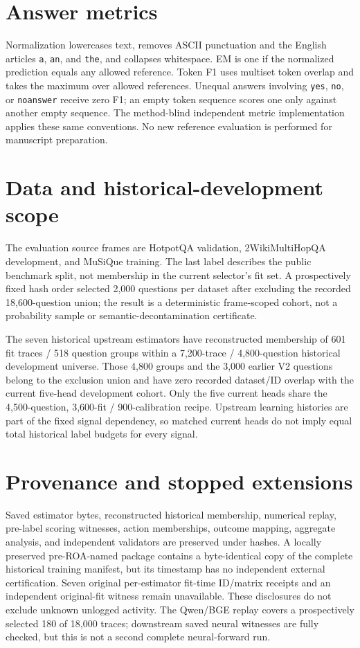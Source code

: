 \documentclass[10pt]{article}
\begin{document}
\section{Answer metrics}
Normalization lowercases text, removes ASCII punctuation and the English articles \texttt{a}, \texttt{an}, and \texttt{the}, and collapses whitespace. EM is one if the normalized prediction equals any allowed reference. Token F1 uses multiset token overlap and takes the maximum over allowed references. Unequal answers involving \texttt{yes}, \texttt{no}, or \texttt{noanswer} receive zero F1; an empty token sequence scores one only against another empty sequence. The method-blind independent metric implementation applies these same conventions. No new reference evaluation is performed for manuscript preparation.

\section{Data and historical-development scope}
The evaluation source frames are HotpotQA validation, 2WikiMultiHopQA development, and MuSiQue training. The last label describes the public benchmark split, not membership in the current selector's fit set. A prospectively fixed hash order selected 2,000 questions per dataset after excluding the recorded 18,600-question union; the result is a deterministic frame-scoped cohort, not a probability sample or semantic-decontamination certificate.

The seven historical upstream estimators have reconstructed membership of 601 fit traces / 518 question groups within a 7,200-trace / 4,800-question historical development universe. Those 4,800 groups and the 3,000 earlier V2 questions belong to the exclusion union and have zero recorded dataset/ID overlap with the current five-head development cohort. Only the five current heads share the 4,500-question, 3,600-fit / 900-calibration recipe. Upstream learning histories are part of the fixed signal dependency, so matched current heads do not imply equal total historical label budgets for every signal.

\section{Provenance and stopped extensions}
Saved estimator bytes, reconstructed historical membership, numerical replay, pre-label scoring witnesses, action memberships, outcome mapping, aggregate analysis, and independent validators are preserved under hashes. A locally preserved pre-ROA-named package contains a byte-identical copy of the complete historical training manifest, but its timestamp has no independent external certification. Seven original per-estimator fit-time ID/matrix receipts and an independent original-fit witness remain unavailable. These disclosures do not exclude unknown unlogged activity. The Qwen/BGE replay covers a prospectively selected 180 of 18,000 traces; downstream saved neural witnesses are fully checked, but this is not a second complete neural-forward run.
\end{document}
